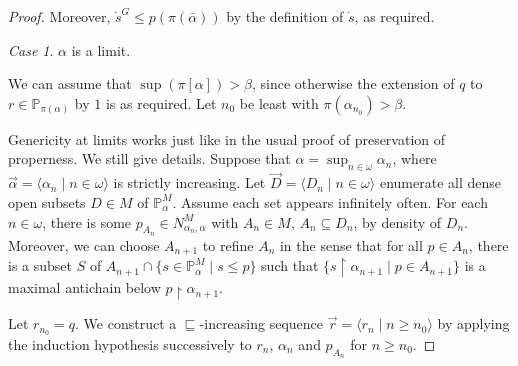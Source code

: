 \documentclass[a4paper, 11pt]{amsart}
\theoremstyle{remark}
\newtheorem*{case*}{Case}
\newcommand{\PP}{\mathbb{P}}
\begin{document}
\begin{proof}
Moreover, $\dot{s}^G\leq p(\pi(\bar{\alpha}))$ by the definition of $\dot{s}$, as required. 

\bigskip 

\begin{case*} 
$\alpha$ is a limit. 
\end{case*} 

We can assume that $\sup(\pi[\alpha])>\beta$, since otherwise the extension of $q$ to $r\in \PP_{\pi(\alpha)}$ by $1$ is as required. 
Let $n_0$ be least with $\pi(\alpha_{n_0})>\beta$. 

Genericity at limits works just like in the usual proof of preservation of properness. We still give details.  
Suppose that $\alpha=\sup_{n\in\omega}\alpha_n$, where $\vec{\alpha}=\langle \alpha_n \mid n\in\omega\rangle$ is strictly increasing. 
Let $\vec{D}=\langle D_n\mid n\in\omega\rangle$ enumerate all dense open subsets $D\in M$ of $\PP_\alpha^M$. 
Assume each set appears infinitely often. 
For each $n\in\omega$, there is some $p_{A_n}\in N_{\alpha_n,\alpha}^M$ with $A_n\in M$, $A_n\subseteq D_n$, by density of $D_n$. 
Moreover, we can choose $A_{n+1}$ to refine $A_n$ in the sense that for all $p\in A_n$, there is a subset $S$ of $A_{n+1}\cap \{s\in \PP_\alpha^M\mid s\leq p\}$ such that $\{s{\upharpoonright}\alpha_{n+1} \mid p\in A_{n+1}\}$ is a maximal antichain below $p{\upharpoonright}\alpha_{n+1}$. 



Let $r_{n_0}=q$. 
We construct a $\sqsubseteq$-increasing sequence $\vec{r}=\langle r_n\mid n\geq n_0\rangle$ by applying the induction hypothesis successively to $r_n$, $\alpha_n$ and $p_{A_n}$ for $n\geq n_0$. 



\end{proof}
\end{document}
